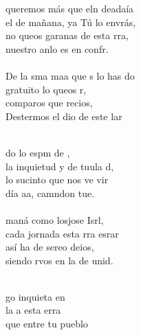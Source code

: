 \begin{cancion}%
	 queremos más que eln deadaía\\
	el de mañana, ya Tú lo envrás,\\
	no queos garanas de esta rra, \\
	nuestro anlo es en confr.\\
\jump\\
	De la sma maa que s lo has do\\
	gratuito lo queos r,\\
	comparos  que recios,\\
	Destermos el dio de este lar\\\jump\\
	\begin{chorus}%
	do lo espm de ,\\
	la inquietud y de tuula d,\\
	lo sucinto que nos ve vir\\
	día aa, camndon tue. \\
\jump\\
	 maná como losjose Isrl,\\
	cada jornada esta rra esrar\\
	así ha de sereo deios,\\
	siendo rvos en la de  unid.\\
	\end{chorus}%
	\jump\\
	go inquieta en \\
	la a  esta erra\\
que entre tu pueblo \\

\end{cancion}
